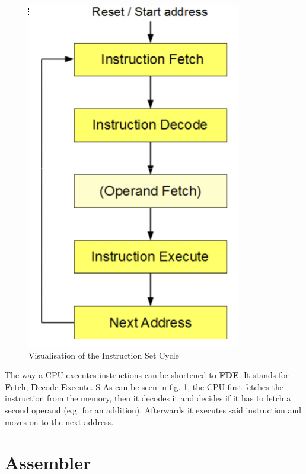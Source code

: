 \documentclass[a4paper, 11pt, nofootinbib]{article}
\begin{document}
\begin{figure}
	\centering
	\includegraphics[keepaspectratio=true,height=20\baselineskip]{instructionCycle.PNG}
	\caption{Visualisation of the Instruction Set Cycle}
	\label{fig:instCycle}
\end{figure}

The way a CPU executes instructions can be shortened to \textbf{FDE}. It stands for \textbf{F}etch, \textbf{D}ecode \textbf{E}xecute. 
\vspace{10px}
S
\noindent As can be seen in fig. \ref{fig:instCycle}, the CPU first fetches the instruction from the memory, then it decodes it and decides if it has to fetch a second operand (e.g. for an addition). Afterwards it executes said instruction and moves on to the next address.

\vspace{200px}

\section{Assembler}
\end{document}
